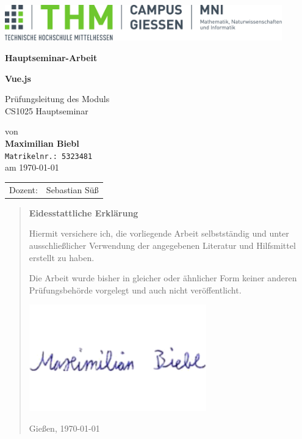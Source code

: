 \documentclass[%
	BCOR=8.25mm,         %
	DIV=12,              %
	parskip=half,				 %
	bibliography=totoc,	 %
	headsepline=on,      %
	]{scrbook}
\begin{document}
\frontmatter

\begin{titlepage}
	\begin{center}
	\includegraphics[width=0.9\textwidth]{img/mni-logo}
	
	\vspace{5cm}	

	\Large\textbf{\sffamily Hauptseminar-Arbeit}

	\vspace{1cm}	

	\huge\textbf{\sffamily Vue.js}

	\normalsize
	\vspace{1cm}

	Prüfungsleitung des Moduls \\
	CS1025 Hauptseminar

	von \\[1cm]	

	\textbf{Maximilian Biebl} \\ \texttt{Matrikelnr.: 5323481}\\ [.5cm]
	am \today
	\end{center}
	\vfill
	\begin{tabular}{ll}
		Dozent: & Sebastian Süß
	\end{tabular}
\end{titlepage}
\cleardoubleemptypage

\pagestyle{empty}
\begin{quote}
	\vspace*{4cm}

	\begin{center}
		\textbf{\Large\sffamily Eidesstattliche Erklärung}
	\end{center}

	Hiermit versichere ich, die vorliegende Arbeit selbstständig und unter
	ausschließlicher Verwendung der angegebenen Literatur und Hilfsmittel
	erstellt zu haben.

	Die Arbeit wurde bisher in gleicher oder ähnlicher Form keiner anderen
	Prüfungsbehörde vorgelegt und auch nicht veröffentlicht.

	\vspace{2em}
	\includegraphics[scale=0.5]{img/signature}

	Gießen, \today
\end{quote}
\cleardoubleemptypage
\end{document}
